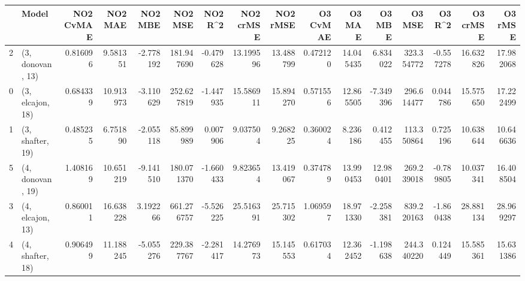 \begin{tabular}{llrrrrrrrrrrrrrr}
\toprule
{} &             Model &  NO2 CvMAE &    NO2 MAE &   NO2 MBE &     NO2 MSE &   NO2 R\textasciicircum2 &  NO2 crMSE &   NO2 rMSE &  O3 CvMAE &     O3 MAE &     O3 MBE &      O3 MSE &    O3 R\textasciicircum2 &   O3 crMSE &    O3 rMSE \\
\midrule
2 &  (3, donovan, 13) &   0.816096 &   9.581351 & -2.778192 &  181.947690 & -0.479628 &  13.199596 &  13.488799 &  0.472120 &  14.045435 &   6.834022 &  323.354772 & -0.557278 &  16.632826 &  17.982068 \\
0 &  (3, elcajon, 18) &   0.684339 &  10.913973 & -3.110629 &  252.627819 & -1.447935 &  15.586911 &  15.894270 &  0.571556 &  12.865505 &  -7.349396 &  296.614477 &  0.044786 &  15.575650 &  17.222499 \\
1 &  (3, shafter, 19) &   0.485235 &   6.751890 & -2.055118 &   85.899989 &  0.007906 &   9.037504 &   9.268225 &  0.360024 &   8.236186 &   0.412455 &  113.350864 &  0.725196 &  10.638644 &  10.646636 \\
5 &  (4, donovan, 19) &   1.408169 &  10.651219 & -9.141510 &  180.071370 & -1.660433 &   9.823654 &  13.419067 &  0.374789 &  13.990453 &  12.980401 &  269.239018 & -0.789805 &  10.037341 &  16.408504 \\
3 &  (4, elcajon, 13) &   0.860011 &  16.638228 &  3.192266 &  661.276757 & -5.526225 &  25.516391 &  25.715302 &  1.069597 &  18.971330 &  -2.258381 &  839.220163 & -1.860438 &  28.881134 &  28.969297 \\
4 &  (4, shafter, 18) &   0.906499 &  11.188245 & -5.055276 &  229.387767 & -2.281417 &  14.276973 &  15.145553 &  0.617034 &  12.362452 &  -1.198638 &  244.340220 &  0.124449 &  15.585361 &  15.631386 \\
\bottomrule
\end{tabular}
